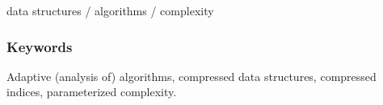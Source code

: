 \documentclass[a4paper,10pt]{article}
\begin{document}
    data structures / algorithms / complexity



\subsubsection*{Keywords}



Adaptive (analysis of) algorithms, 
compressed data structures, 
compressed indices,
parameterized complexity.


\end{document}
